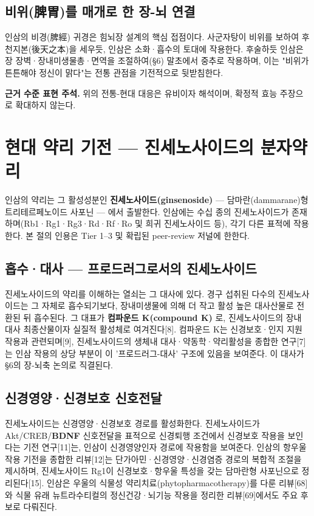 \documentclass[11pt,oneside]{book}
\newenvironment{authnote}
  {\par\smallskip\begingroup\leftskip=7mm\rightskip=5mm\small\color{muted}\noindent\ignorespaces}
  {\par\endgroup\smallskip}
\begin{document}
\subsection{비위(脾胃)를 매개로 한 장-뇌 연결}
인삼의 비경(脾經) 귀경은 힘뇌장 설계의 핵심 접점이다. 사군자탕이 비위를 보하여 후천지본(後天之本)을 세우듯, 인삼은 소화·흡수의 토대에 작용한다. 후술하듯 인삼은 장 장벽·장내미생물총·면역을 조절하여(§6) 말초에서 중추로 작용하며, 이는 "비위가 튼튼해야 정신이 맑다"는 전통 관점을 기전적으로 뒷받침한다.

\begin{authnote}\textbf{근거 수준 표현 주석.} 위의 전통-현대 대응은 유비이자 해석이며, 확정적 효능 주장으로 확대하지 않는다.\end{authnote}
\section{현대 약리 기전 — 진세노사이드의 분자약리}
인삼의 약리는 그 활성성분인 \textbf{진세노사이드(ginsenoside)} — 담마란(dammarane)형 트리테르페노이드 사포닌 — 에서 출발한다. 인삼에는 수십 종의 진세노사이드가 존재하며(Rb1·Rg1·Rg3·Rd·Rf·Ro 및 희귀 진세노사이드 등), 각기 다른 표적에 작용한다. 본 절의 인용은 Tier 1–3 및 확립된 peer-review 저널에 한한다.

\subsection{흡수·대사 — 프로드러그로서의 진세노사이드}
진세노사이드의 약리를 이해하는 열쇠는 그 대사에 있다. 경구 섭취된 다수의 진세노사이드는 그 자체로 흡수되기보다, 장내미생물에 의해 더 작고 활성 높은 대사산물로 전환된 뒤 흡수된다. 그 대표가 \textbf{컴파운드 K(compound K)} 로, 진세노사이드의 장내 대사 최종산물이자 실질적 활성체로 여겨진다[8]. 컴파운드 K는 신경보호·인지 지원 작용과 관련되며[9], 진세노사이드의 생체내 대사·약동학·약리활성을 종합한 연구[7]는 인삼 작용의 상당 부분이 이 '프로드러그-대사' 구조에 있음을 보여준다. 이 대사가 §6의 장-뇌축 논의로 직결된다.

\subsection{신경영양·신경보호 신호전달}
진세노사이드는 신경영양·신경보호 경로를 활성화한다. 진세노사이드가 Akt/CREB/\textbf{BDNF} 신호전달을 표적으로 신경퇴행 조건에서 신경보호 작용을 보인다는 기전 연구[11]는, 인삼이 신경영양인자 경로에 작용함을 보여준다. 인삼의 항우울 작용 기전을 종합한 리뷰[12]는 단가아민·신경영양·신경염증 경로의 복합적 조절을 제시하며, 진세노사이드 Rg1이 신경보호·항우울 특성을 갖는 담마란형 사포닌으로 정리된다[15]. 인삼은 우울의 식물성 약리치료(phytopharmacotherapy)를 다룬 리뷰[68]와 식물 유래 뉴트라수티컬의 정신건강·뇌기능 작용을 정리한 리뷰[69]에서도 주요 후보로 다뤄진다.
\end{document}
